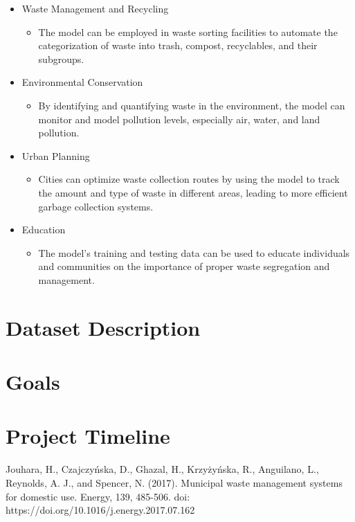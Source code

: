 \documentclass[conference]{IEEEtran}
\begin{document}
\begin{itemize}
  \item Waste Management and Recycling    
    \begin{itemize}
      \item The model can be employed in waste sorting facilities to automate the categorization of waste into trash, compost, recyclables, and their subgroups.
    \end{itemize} 
  \item Environmental Conservation
    \begin{itemize}
      \item By identifying and quantifying waste in the environment, the model can monitor and model pollution levels, especially air, water, and land pollution.
    \end{itemize}
  \item Urban Planning
    \begin{itemize}
      \item Cities can optimize waste collection routes by using the model to track the amount and type of waste in different areas, leading to more efficient garbage collection systems. 
    \end{itemize}
  \item Education
    \begin{itemize}
      \item The model’s training and testing data can be used to educate individuals and communities on the importance of proper waste segregation and management. 
    \end{itemize}
\end{itemize}

\section{Dataset Description}

\section{Goals}

\section{Project Timeline}


\begin{thebibliography}{00}
   Jouhara, H., Czajczyńska, D., Ghazal, H., Krzyżyńska, R., Anguilano, L., Reynolds, A. J., and Spencer, N. (2017). Municipal waste management systems for domestic use. Energy, 139, 485-506. doi: https://doi.org/10.1016/j.energy.2017.07.162
\end{thebibliography}
\end{document}
